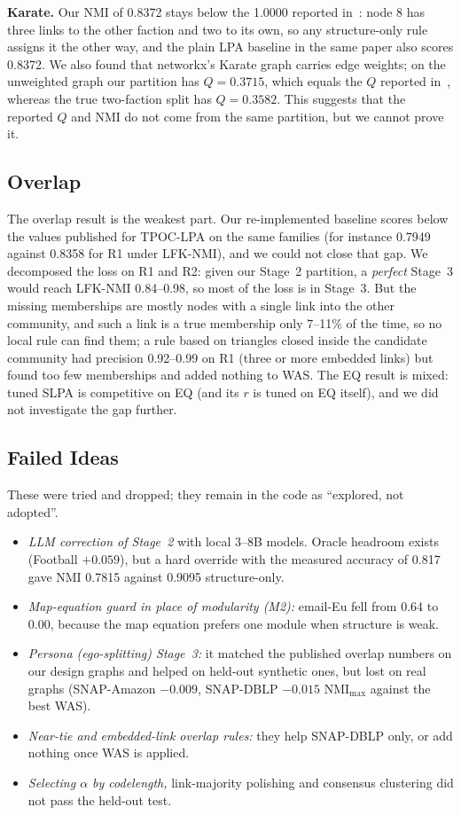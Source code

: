 \documentclass[conference]{IEEEtran}
\begin{document}
\textbf{Karate.} Our NMI of 0.8372 stays below the 1.0000 reported in~\cite{kong2026}: node 8 has three links to the other faction and two to its own, so any structure-only rule assigns it the other way, and the plain LPA baseline in the same paper also scores 0.8372. We also found that networkx's Karate graph carries edge weights; on the unweighted graph our partition has $Q=0.3715$, which equals the $Q$ reported in~\cite{kong2026}, whereas the true two-faction split has $Q=0.3582$. This suggests that the reported $Q$ and NMI do not come from the same partition, but we cannot prove it.

\subsection{Overlap}
The overlap result is the weakest part. Our re-implemented baseline scores below the values published for TPOC-LPA on the same families (for instance 0.7949 against 0.8358 for R1 under LFK-NMI), and we could not close that gap. We decomposed the loss on R1 and R2: given our Stage~2 partition, a \emph{perfect} Stage~3 would reach LFK-NMI 0.84--0.98, so most of the loss is in Stage~3. But the missing memberships are mostly nodes with a single link into the other community, and such a link is a true membership only 7--11\% of the time, so no local rule can find them; a rule based on triangles closed inside the candidate community had precision 0.92--0.99 on R1 (three or more embedded links) but found too few memberships and added nothing to WAS. The EQ result is mixed: tuned SLPA is competitive on EQ (and its $r$ is tuned on EQ itself), and we did not investigate the gap further.

\subsection{Failed Ideas}\label{sec:neg}
These were tried and dropped; they remain in the code as ``explored, not adopted''.
\begin{itemize}
\item \emph{LLM correction of Stage~2} with local 3--8B models. Oracle headroom exists (Football $+0.059$), but a hard override with the measured accuracy of 0.817 gave NMI 0.7815 against 0.9095 structure-only.
\item \emph{Map-equation guard in place of modularity (M2):} email-Eu fell from 0.64 to 0.00, because the map equation prefers one module when structure is weak.
\item \emph{Persona (ego-splitting) Stage~3:} it matched the published overlap numbers on our design graphs and helped on held-out synthetic ones, but lost on real graphs (SNAP-Amazon $-0.009$, SNAP-DBLP $-0.015$ $\mathrm{NMI}_{\max}$ against the best WAS).
\item \emph{Near-tie and embedded-link overlap rules:} they help SNAP-DBLP only, or add nothing once WAS is applied.
\item \emph{Selecting $\alpha$ by codelength,} link-majority polishing and consensus clustering did not pass the held-out test.
\end{itemize}
\end{document}
